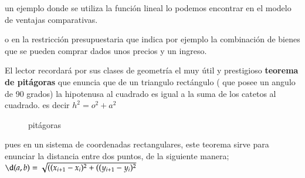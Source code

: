 \documentclass[12pt]{article}
\begin{document}
\newpage







un ejemplo donde se utiliza la función lineal lo podemos encontrar en el modelo de ventajas comparativas.

o en la restricción presupuestaria que indica por ejemplo la combinación de bienes que se pueden comprar dados unos precios y un ingreso.





El lector recordará por sus clases de geometría el muy útil y prestigioso \textbf{teorema de pitágoras} que enuncia que de un triangulo rectángulo ( que posee un angulo de 90 grados)  la hipotenusa al cuadrado es igual a la suma de los catetos al cuadrado. es decir $h^{2}= o^{2}+a^{2}$


\begin{figure}

\begin{center}

\caption{pitágoras}


\end{center}

\end{figure}




pues en un sistema  de coordenadas rectangulares, este teorema sirve para enunciar la distancia entre dos puntos, de la siguiente manera; $\d(a,b)=\sqrt{((x_{i+1}-x_{i})^{2} + ((y_{i+1}-y_{i})^{2}}$
\end{document}
